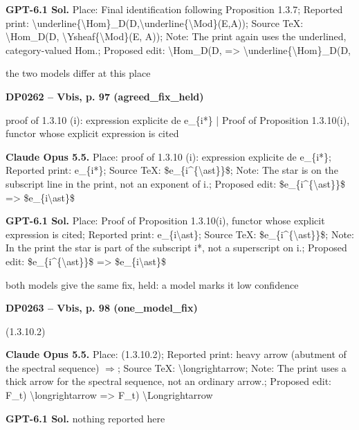 \textbf{GPT-6.1 Sol.} Place: Final identification following Proposition 1.3.7; Reported print: \textbackslash{}underline\{\textbackslash{}Hom\}\_D(D,\textbackslash{}underline\{\textbackslash{}Mod\}(E,A)); Source TeX: \textbackslash{}Hom\_D(D, \textbackslash{}Ysheaf\{\textbackslash{}Mod\}(E, A)); Note: The print again uses the underlined, category-valued Hom.; Proposed edit: \textbackslash{}Hom\_D(D, =\allowbreak > \textbackslash{}underline\{\textbackslash{}Hom\}\_D(D,\par
the two models differ at this place\par
\par\noindent\hypertarget{DP0262}{}\textbf{DP0262 -- Vbis, p. 97 (agreed\_fix\_held)}\par
proof of 1.3.10 (i): expression explicite de e\_\{i*\} | Proof of Proposition 1.3.10(i), functor whose explicit expression is cited\par
\textbf{Claude Opus 5.5.} Place: proof of 1.3.10 (i): expression explicite de e\_\{i*\}; Reported print: e\_\{i*\}; Source TeX: \$e\_\{i\textasciicircum{}\{\textbackslash{}ast\}\}\$; Note: The star is on the subscript line in the print, not an exponent of i.; Proposed edit: \$e\_\{i\textasciicircum{}\{\textbackslash{}ast\}\}\$ =\allowbreak > \$e\_\{i\textbackslash{}ast\}\$\par
\textbf{GPT-6.1 Sol.} Place: Proof of Proposition 1.3.10(i), functor whose explicit expression is cited; Reported print: e\_\{i\textbackslash{}ast\}; Source TeX: \$e\_\{i\textasciicircum{}\{\textbackslash{}ast\}\}\$; Note: In the print the star is part of the subscript i*, not a superscript on i.; Proposed edit: \$e\_\{i\textasciicircum{}\{\textbackslash{}ast\}\}\$ =\allowbreak > \$e\_\{i\textbackslash{}ast\}\$\par
both models give the same fix, held: a model marks it low confidence\par
\par\noindent\hypertarget{DP0263}{}\textbf{DP0263 -- Vbis, p. 98 (one\_model\_fix)}\par
(1.3.10.2)\par
\textbf{Claude Opus 5.5.} Place: (1.3.10.2); Reported print: heavy arrow (abutment of the spectral sequence) \ensuremath{\Longrightarrow}; Source TeX: \textbackslash{}longrightarrow; Note: The print uses a thick arrow for the spectral sequence, not an ordinary arrow.; Proposed edit: F\_t) \textbackslash{}longrightarrow =\allowbreak > F\_t) \textbackslash{}Longrightarrow\par
\textbf{GPT-6.1 Sol.} nothing reported here\par
